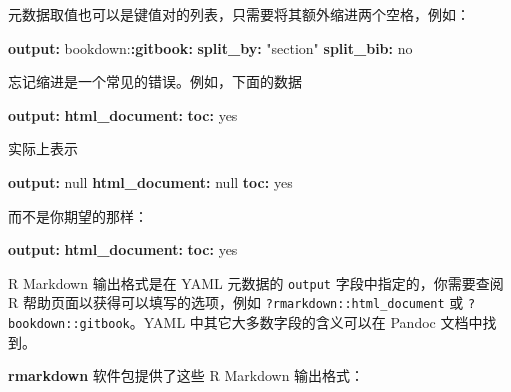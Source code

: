 \documentclass[
  12pt,
]{krantz}
\newenvironment{Shaded}{\begin{snugshade}}{\end{snugshade}}
\newcommand{\AttributeTok}[1]{\textcolor[rgb]{0.13,0.29,0.53}{#1}}
\newcommand{\CharTok}[1]{\textcolor[rgb]{0.31,0.60,0.02}{#1}}
\newcommand{\FunctionTok}[1]{\textcolor[rgb]{0.13,0.29,0.53}{\textbf{#1}}}
\newcommand{\KeywordTok}[1]{\textcolor[rgb]{0.13,0.29,0.53}{\textbf{#1}}}
\newcommand{\StringTok}[1]{\textcolor[rgb]{0.31,0.60,0.02}{#1}}
\theoremstyle{definition}
\theoremstyle{definition}
\theoremstyle{definition}
\theoremstyle{definition}
\theoremstyle{remark}
\begin{document}
元数据取值也可以是键值对的列表，只需要将其额外缩进两个空格，例如：

\begin{Shaded}
\begin{Highlighting}[]
\FunctionTok{output}\KeywordTok{:}
\AttributeTok{  bookdown:}\FunctionTok{:gitbook}\KeywordTok{:}
\AttributeTok{    }\FunctionTok{split\_by}\KeywordTok{:}\AttributeTok{ }\StringTok{"section"}
\AttributeTok{    }\FunctionTok{split\_bib}\KeywordTok{:}\AttributeTok{ }\CharTok{no}
\end{Highlighting}
\end{Shaded}

忘记缩进是一个常见的错误。例如，下面的数据

\begin{Shaded}
\begin{Highlighting}[]
\FunctionTok{output}\KeywordTok{:}
\FunctionTok{html\_document}\KeywordTok{:}
\FunctionTok{toc}\KeywordTok{:}\AttributeTok{ }\CharTok{yes}
\end{Highlighting}
\end{Shaded}

实际上表示

\begin{Shaded}
\begin{Highlighting}[]
\FunctionTok{output}\KeywordTok{:}\AttributeTok{ }\CharTok{null}
\FunctionTok{html\_document}\KeywordTok{:}\AttributeTok{ }\CharTok{null}
\FunctionTok{toc}\KeywordTok{:}\AttributeTok{ }\CharTok{yes}
\end{Highlighting}
\end{Shaded}

而不是你期望的那样：

\begin{Shaded}
\begin{Highlighting}[]
\FunctionTok{output}\KeywordTok{:}
\AttributeTok{  }\FunctionTok{html\_document}\KeywordTok{:}
\AttributeTok{    }\FunctionTok{toc}\KeywordTok{:}\AttributeTok{ }\CharTok{yes}
\end{Highlighting}
\end{Shaded}

R Markdown 输出格式是在 YAML 元数据的 \texttt{output} 字段中指定的，你需要查阅 R 帮助页面以获得可以填写的选项，例如 \texttt{?rmarkdown::html\_document} 或 \texttt{?bookdown::gitbook}。YAML 中其它大多数字段的含义可以在 Pandoc 文档中找到。

\textbf{rmarkdown} 软件包提供了这些 R Markdown 输出格式：
\end{document}
